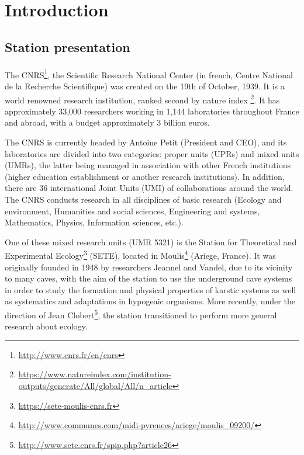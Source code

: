 \documentclass{article}
\begin{document}
\newpage
\section*{Introduction}

\subsection*{Station presentation}

\paragraph{}
The CNRS\footnote{\url{http://www.cnrs.fr/en/cnrs}}, the Scientific Research National Center (in french, Centre National de la Recherche Scientifique) was created on the 19th of October, 1939. It is a world renowned research institution, ranked second by nature index \footnote{\url{https://www.natureindex.com/institution-outputs/generate/All/global/All/n_article}}. It has approximately 33,000 researchers working in 1,144 laboratories throughout France and abroad, with a budget approximately 3 billion euros. 

The CNRS is currently headed by Antoine Petit (President and CEO), and its laboratories are divided into two categories: proper units (UPRs) and mixed units (UMRs), the latter being managed in association with other French institutions (higher education establishment or another research institutions). In addition, there are 36 international Joint Units (UMI) of collaborations around the world. The CNRS conducts research in all disciplines of basic research (Ecology and environment, Humanities and social sciences, Engineering and systems, Mathematics, Physics, Information sciences, etc.).

One of these mixed research units (UMR 5321) is the Station for Theoretical and Experimental Ecology\footnote{\url{https://sete-moulis-cnrs.fr}} (SETE), located in Moulis\footnote{\url{http://www.communes.com/midi-pyrenees/ariege/moulis_09200/}} (Ariege, France). It was originally founded in 1948 by researchers Jeannel and Vandel, due to its vicinity to many caves, with the aim of the station to use the underground cave systems in order to study the formation and physical properties of karstic systems as well as systematics and adaptations in hypogeaic organisms. More recently, under the direction of Jean Clobert\footnote{\url{http://www.sete.cnrs.fr/spip.php?article26}}, the station transitioned to perform more general research about ecology.
\end{document}
